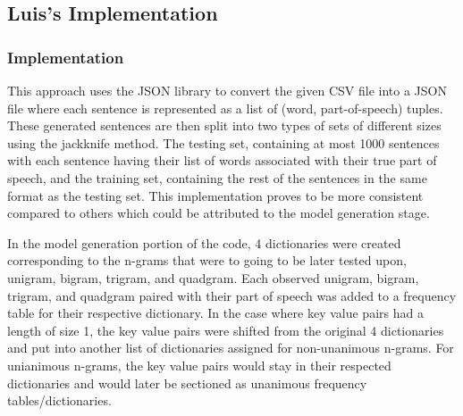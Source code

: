 \subsection{Luis's Implementation}

\subsubsection{Implementation}

This approach uses the JSON library to convert the given CSV file into a JSON file where each sentence is represented as a list of (word, part-of-speech) tuples. These generated sentences are then split into two types of sets of different sizes using the jackknife method. The testing set, containing at most 1000 sentences with each sentence having their list of words associated with their true part of speech, and the training set, containing the rest of the sentences in the same format as the testing set. This implementation proves to be more consistent compared to others which could be attributed to the model generation stage.

In the model generation portion of the code, 4 dictionaries were created corresponding to the n-grams that were to going to be later tested upon, unigram, bigram, trigram, and quadgram. Each observed unigram, bigram, trigram, and quadgram paired with their part of speech was added to a frequency table for their respective dictionary. In the case where key value pairs had a length of size 1, the key value pairs were shifted from the original 4 dictionaries and put into another list of dictionaries assigned for non-unanimous n-grams. For unianimous n-grams, the key value pairs would stay in their respected dictionaries and would later be sectioned as unanimous frequency tables/dictionaries. 

